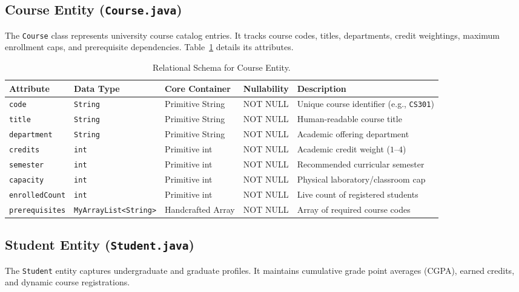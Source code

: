 \subsection{Course Entity (\texttt{Course.java})}
The \texttt{Course} class represents university course catalog entries. It tracks course codes, titles, departments, credit weightings, maximum enrollment caps, and prerequisite dependencies. Table~\ref{tab:course_schema} details its attributes.

\begin{table}[H]
\centering
\small
\begin{tabularx}{\textwidth}{llllX}
\toprule
\textbf{Attribute} & \textbf{Data Type} & \textbf{Core Container} & \textbf{Nullability} & \textbf{Description} \\
\midrule
\texttt{code} & \texttt{String} & Primitive String & NOT NULL & Unique course identifier (e.g., \texttt{CS301}) \\
\texttt{title} & \texttt{String} & Primitive String & NOT NULL & Human-readable course title \\
\texttt{department} & \texttt{String} & Primitive String & NOT NULL & Academic offering department \\
\texttt{credits} & \texttt{int} & Primitive int & NOT NULL & Academic credit weight ($1$--$4$) \\
\texttt{semester} & \texttt{int} & Primitive int & NOT NULL & Recommended curricular semester \\
\texttt{capacity} & \texttt{int} & Primitive int & NOT NULL & Physical laboratory/classroom cap \\
\texttt{enrolledCount} & \texttt{int} & Primitive int & NOT NULL & Live count of registered students \\
\texttt{prerequisites} & \texttt{MyArrayList<String>} & Handcrafted Array & NOT NULL & Array of required course codes \\
\bottomrule
\end{tabularx}
\caption{Relational Schema for Course Entity.}
\label{tab:course_schema}
\end{table}

\subsection{Student Entity (\texttt{Student.java})}
The \texttt{Student} entity captures undergraduate and graduate profiles. It maintains cumulative grade point averages (CGPA), earned credits, and dynamic course registrations.

